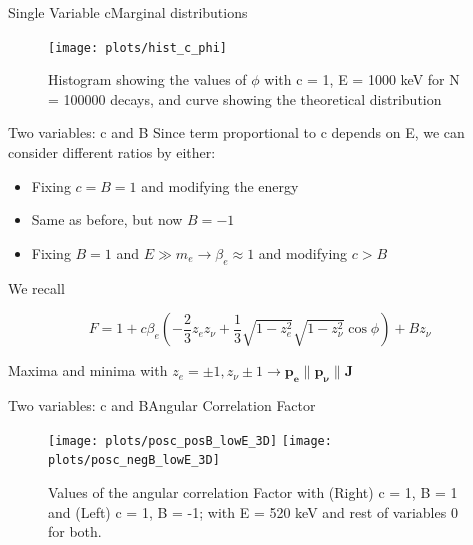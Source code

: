 \documentclass{beamer}
\begin{document}
\begin{frame}{Single Variable c}{Marginal distributions}
	
	\begin{figure}
		\centering
		\texttt{[image: plots/hist\_c\_phi]}
		\caption{Histogram showing the values of $\phi$ with c = 1, E = 1000 keV for N = 100000 decays, and curve showing the theoretical distribution}
	\end{figure}
\end{frame}
\begin{frame}{Two variables: c and B}
	Since term proportional to c depends on E, we can consider different ratios by either:
	\begin{itemize}
		\item Fixing $c = B = 1$ and modifying the energy
		\item Same as before, but now $B = -1$
		\item Fixing $B = 1$ and $E \gg m_e \rightarrow \beta_e \approx 1$ and modifying $c > B$
	\end{itemize}
	
	We recall
	
	$$F = 1 + c\beta_e\left(-\frac 23 z_ez_\nu + \frac 13 \sqrt{1-z^2_e}\sqrt{1-z^2_\nu}\cos \phi\right) + Bz_\nu$$
	
	Maxima and minima with $z_e=\pm1,z_\nu \pm1 \rightarrow \boldsymbol{p_e} \parallel \boldsymbol{p_\nu} \parallel \boldsymbol{J}$  
	
\end{frame}
\begin{frame}{Two variables: c and B}{Angular Correlation Factor}
	\begin{figure}
		\centering
		\texttt{[image: plots/posc\_posB\_lowE\_3D]}
		\texttt{[image: plots/posc\_negB\_lowE\_3D]}
		\caption{Values of the angular correlation Factor with (Right) c = 1, B = 1 and (Left) c = 1, B = -1; with E = 520 keV and rest of variables 0 for both.}
	\end{figure}
\end{frame}
\end{document}
